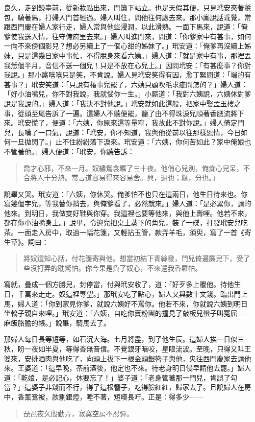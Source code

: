 良久，走到鏡臺前，從新妝點出來，門簾下站立。也是天假其便，只見玳安夾著氈包，騎著馬，打婦人門首經過。婦人叫住，問他往何處去來。那小廝說話乖覺，常跟西門慶在婦人家行走，婦人常與他些浸潤，以此滑熟。一面下馬來，說道：「俺爹使我送人情，往守備府里去來。」婦人叫進門來，問道：「你爹家中有甚事，如何一向不來傍個影兒？想必另續上了一個心甜的姊妹了。」玳安道：「俺爹再沒續上姊妹，只是這幾日家中事忙，不得脫身來看六姨。」婦人道：「就是家中有事，那裡丟我恁個半月，音信不送一個兒！只是不放在心兒上。」因問玳安：「有甚麼事？你對我說。」那小廝嘻嘻只是笑，不肯說。婦人見玳安笑得有因，愈丁緊問道：「端的有甚事？」玳安笑道：「只說有椿事兒罷了，六姨只顧吹毛求疵問怎的？」婦人道：「好小油嘴兒，你不對我說，我就惱你一生。」小廝道：「我對六姨說，六姨休對爹說是我說的。」婦人道：「我決不對他說。」玳安就如此這般，把家中娶孟玉樓之事，從頭至尾告訴了一遍。這婦人不聽便罷，聽了由不得珠淚兒順著香腮流將下來。玳安慌了，便道：「六姨，你原來這等量窄，我故此不對你說。」婦人倚定門兒，長嘆了一口氣，說道：「玳安，你不知道，我與他從前以往那樣恩情，今日如何一旦拋閃了。」止不住紛紛落下淚來。玳安道：「六姨，你何苦如此？家中俺娘也不管著他。」婦人便道：「玳安，你聽告訴：
\begin{quote}
喬才心邪，不來一月。奴繡鴛衾曠了三十夜。他俏心兒別，俺痴心兒呆，不合將人十分熱。常言道容易得來容易舍。興，過也；緣，分也。」
\end{quote}

說畢又哭。玳安道：「六姨，你休哭。俺爹怕不也只在這兩日，他生日待來也。你寫幾個字兒，等我替你捎去，與俺爹看了，必然就來。」婦人道：「是必累你，請的他來。到明日，我做雙好鞋與你穿。我這裡也要等他來，與他上壽哩。他若不來，都在你小油嘴身上。」說畢，令迎兒把桌上蒸下的角兒，裝了一碟，打發玳安兒吃茶。一面走入房中，取過一幅花箋，又輕拈玉管，款弄羊毛，須臾，寫了一首《寄生草》。詞曰：
\begin{quote}
將奴這知心話，付花箋寄與他。想當初結下青絲發，門兒倚遍簾兒下，受了些沒打弄的耽驚怕。你今果是負了奴心，不來還我香羅帕。
\end{quote}

寫就，疊成一個方勝兒，封停當，付與玳安收了，道：「好歹多上覆他。待他生日，千萬來走走。奴這裡專望。」那玳安吃了點心，婦人又與數十文錢。臨出門上馬，婦人道：「你到家見你爹，就說六姨好不罵你。他若不來，你就說六姨到明日坐轎子親自來哩。」玳安道：「六姨，自吃你賣粉團的撞見了敲板兒蠻子叫冤屈——麻飯胳膽的帳。」說畢，騎馬去了。

那婦人每日長等短等，如石沉大海。七月將盡，到了他生辰。這婦人挨一日似三秋，盼一夜如半夏，等得杳無音信。不覺銀牙暗咬，星眼流波。至晚，只得又叫王婆來，安排酒肉與他吃了，向頭上拔下一根金頭銀簪子與他，央往西門慶家去請他來。王婆道：「這早晚，茶前酒後，他定也不來。待老身明日侵早請他去罷。」婦人道：「乾娘，是必記心，休要忘了！」婆子道：「老身管著那一門兒，肯誤了勾當？」這婆子非錢而不行，得了這根簪子，吃得臉紅紅，歸家去了。且說婦人在房中，香薰鴛被，款剔銀燈，睡不著，短嘆長吁。正是：得多少——
\begin{quote}
琵琶夜久殷勤弄，寂寞空房不忍彈。
\end{quote}


